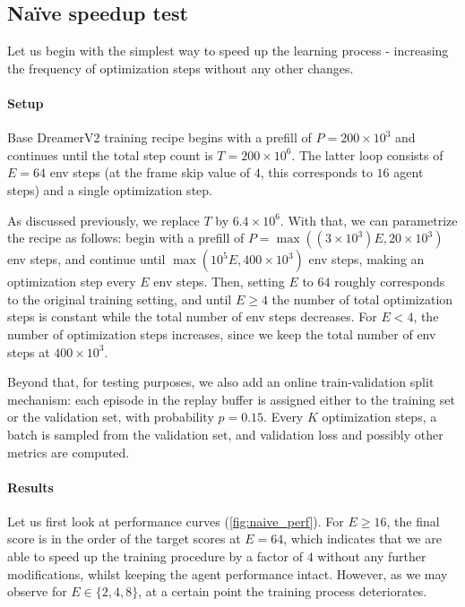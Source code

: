 \documentclass[twoside,11pt]{article}
\begin{document}
\subsection{Na\"ive speedup test}

Let us begin with the simplest way to speed up the learning process - increasing the frequency of optimization steps without any other changes.

\paragraph{Setup} Base DreamerV2 training recipe begins with a prefill of $P = 200 \times 10^3$ and continues until the total step count is $T = 200 \times 10^6$. The latter loop consists of $E = 64$ env steps (at the frame skip value of $4$, this corresponds to $16$ agent steps) and a single optimization step.

As discussed previously, we replace $T$ by $6.4 \times 10^6$. With that, we can parametrize the recipe as follows: begin with a prefill of $P = \max((3 \times 10^3)E, 20 \times 10^3)$ env steps, and continue until $\max(10^5 E, 400 \times 10^3)$ env steps, making an optimization step every $E$ env steps. Then, setting $E$ to $64$ roughly corresponds to the original training setting, and until $E \geq 4$ the number of total optimization steps is constant while the total number of env steps decreases. For $E < 4$, the number of optimization steps increases, since we keep the total number of env steps at $400 \times 10^3$.

Beyond that, for testing purposes, we also add an online train-validation split mechanism: each episode in the replay buffer is assigned either to the training set or the validation set, with probability $p = 0.15$. Every $K$ optimization steps, a batch is sampled from the validation set, and validation loss and possibly other metrics are computed.

\paragraph{Results} Let us first look at performance curves (\autoref{fig:naive_perf}). For $E \geq 16$, the final score is in the order of the target scores at $E = 64$, which indicates that we are able to speed up the training procedure by a factor of $4$ without any further modifications, whilst keeping the agent performance intact. However, as we may observe for $E \in \{2, 4, 8\}$, at a certain point the training process deteriorates.
\end{document}

